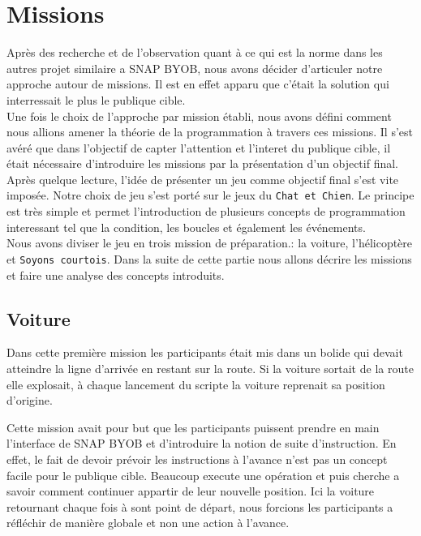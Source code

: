 \section{Missions}
\label{missions}
Après des recherche et de l'observation quant à ce qui est la norme dans les autres projet similaire a SNAP BYOB, nous avons décider d'articuler notre approche autour de missions. Il est en effet apparu que c'était la solution qui interressait le plus le publique cible.\\

Une fois le choix de l'approche par mission établi, nous avons défini comment nous allions amener la théorie de la programmation à travers ces missions. Il s'est avéré que dans l'objectif de capter l'attention et l'interet du publique cible, il était nécessaire d'introduire les missions par la présentation d'un objectif final. Après quelque lecture, l'idée de présenter un jeu comme objectif final s'est vite imposée. Notre choix de jeu s'est porté sur le jeux du \texttt{Chat et Chien}. Le principe est très simple et permet l'introduction de plusieurs concepts de programmation interessant tel que la condition, les boucles et également les événements.\\

Nous avons diviser le jeu en trois mission de préparation.: la voiture, l'hélicoptère et \texttt{Soyons courtois}. Dans la suite de cette partie nous allons décrire les missions et faire une analyse des concepts introduits.

\subsection{Voiture}
Dans cette première mission les participants était mis dans un bolide qui devait atteindre la ligne d'arrivée en restant sur la route. Si la voiture sortait de la route elle explosait, à chaque lancement du scripte la voiture reprenait sa position d'origine.

Cette mission avait pour but que les participants puissent prendre en main l'interface de SNAP BYOB et d'introduire la notion de suite d'instruction. En effet, le fait de devoir prévoir les instructions à l'avance n'est pas un concept facile pour le publique cible. Beaucoup execute une opération et puis cherche a savoir comment continuer appartir de leur nouvelle position. Ici la voiture retournant chaque fois à sont point de départ, nous forcions les participants a réfléchir de manière globale et non une action à l'avance.

